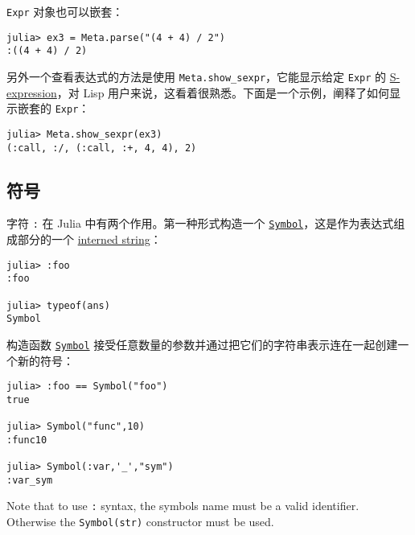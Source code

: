 \texttt{Expr} 对象也可以嵌套：




\begin{verbatim}
julia> ex3 = Meta.parse("(4 + 4) / 2")
:((4 + 4) / 2)
\end{verbatim}



另外一个查看表达式的方法是使用 \texttt{Meta.show\_sexpr}，它能显示给定 \texttt{Expr} 的 \href{https://en.wikipedia.org/wiki/S-expression}{S-expression}，对 Lisp 用户来说，这看着很熟悉。下面是一个示例，阐释了如何显示嵌套的 \texttt{Expr}：




\begin{verbatim}
julia> Meta.show_sexpr(ex3)
(:call, :/, (:call, :+, 4, 4), 2)
\end{verbatim}



\hypertarget{17960433860062790097}{}


\subsection{符号}



字符 \texttt{:} 在 Julia 中有两个作用。第一种形式构造一个  \hyperlink{18332791376992528422}{\texttt{Symbol}}，这是作为表达式组成部分的一个 \href{https://en.wikipedia.org/wiki/String\_interning}{interned string}：




\begin{verbatim}
julia> :foo
:foo

julia> typeof(ans)
Symbol
\end{verbatim}



构造函数 \hyperlink{18332791376992528422}{\texttt{Symbol}} 接受任意数量的参数并通过把它们的字符串表示连在一起创建一个新的符号：




\begin{verbatim}
julia> :foo == Symbol("foo")
true

julia> Symbol("func",10)
:func10

julia> Symbol(:var,'_',"sym")
:var_sym
\end{verbatim}



Note that to use \texttt{:} syntax, the symbol{\textquotesingle}s name must be a valid identifier. Otherwise the \texttt{Symbol(str)} constructor must be used.



